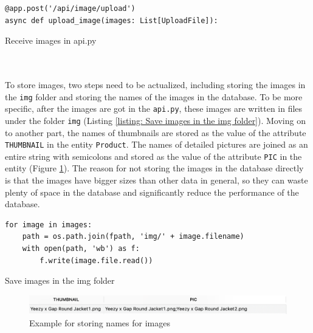 \documentclass{article}
\begin{document}
\begin{listing}[!htp]
\begin{verbatim}
@app.post('/api/image/upload')
async def upload_image(images: List[UploadFile]):
\end{verbatim}
\caption{Receive images in api.py}
\label{listing: Receive images in api.py}
\end{listing}
\newpage
\leavevmode
\\\\
To store images, two steps need to be actualized, including storing the images in the \verb|img| folder and storing the names of the images in the database. To be more specific, after the images are got in the \verb|api.py|, these images are written in files under the folder \verb|img| (Listing \ref{listing: Save images in the img folder}). Moving on to another part, the names of thumbnails are stored as the value of the attribute \verb|THUMBNAIL| in the entity \verb|Product|. The names of detailed pictures are joined as an entire string with semicolons and stored as the value of the attribute \verb|PIC| in the entity (Figure \ref{fig:Example for storing names for images}). The reason for not storing the images in the database directly is that the images have bigger sizes than other data in general, so they can waste plenty of space in the database and significantly reduce the performance of the database.
\begin{listing}[!htp]
\begin{verbatim}
for image in images:
    path = os.path.join(fpath, 'img/' + image.filename)
    with open(path, 'wb') as f:
        f.write(image.file.read())
\end{verbatim}
\caption{Save images in the img folder}
\label{listing: Save images in the img folder}
\end{listing}
\begin{figure}[!htp]
    \centering
    \includegraphics[width=1\textwidth]{Example for storing names for images.png}
    \caption{Example for storing names for images}
    \label{fig:Example for storing names for images}
\end{figure}
\\\\
\end{document}
